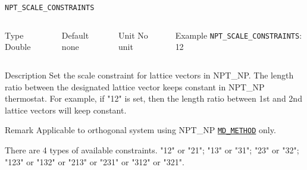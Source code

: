 \begin{frame}[allowframebreaks]{\texttt{NPT\_SCALE\_CONSTRAINTS}} \label{NPT_SCALE_CONSTRAINTS}
\vspace*{-12pt}
\begin{columns}
\begin{block}{Type}
Double
\end{block}

\begin{block}{Default}
none
\end{block}

\begin{block}{Unit}
No unit
\end{block}

\begin{block}{Example}
\texttt{NPT\_SCALE\_CONSTRAINTS}: 12
\end{block}
\end{columns}

\begin{block}{Description}
Set the scale constraint for lattice vectors in NPT\_NP. The length ratio between the designated lattice vector keeps constant in NPT\_NP thermostat. For example, if "12" is set, then the length ratio between 1st and 2nd lattice vectors will keep constant.
\end{block}

\begin{block}{Remark}
Applicable to orthogonal system using NPT\_NP \hyperlink{MD_METHOD}{\texttt{MD\_METHOD}} only.

There are 4 types of available constraints. "12" or "21"; "13" or "31"; "23" or "32"; "123" or "132" or "213" or "231" or "312" or "321".
\end{block}

\end{frame}




